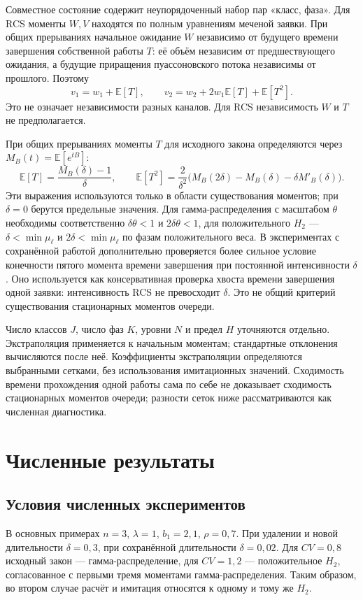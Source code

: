 \documentclass[a4paper,12pt]{article}
\begin{document}
Совместное состояние содержит неупорядоченный набор пар «класс, фаза». Для RCS моменты \(W,V\) находятся по полным уравнениям меченой заявки. При общих прерываниях начальное ожидание \(W\) независимо от будущего времени завершения собственной работы \(T\): её объём независим от предшествующего ожидания, а будущие приращения пуассоновского потока независимы от прошлого. Поэтому
\[
v_1=w_1+\mathbb E[T],\qquad
v_2=w_2+2w_1\mathbb E[T]+\mathbb E[T^2].
\]
Это не означает независимости разных каналов. Для RCS независимость \(W\) и \(T\) не предполагается.

При общих прерываниях моменты \(T\) для исходного закона определяются через \(M_B(t)=\mathbb E[e^{tB}]\):
\[
\mathbb E[T]=\frac{M_B(\delta)-1}{\delta},\qquad
\mathbb E[T^2]=\frac{2}{\delta^2}\bigl(M_B(2\delta)-M_B(\delta)-\delta M'_B(\delta)\bigr).
\]
Эти выражения используются только в области существования моментов; при \(\delta=0\) берутся предельные значения. Для гамма-распределения с масштабом \(\theta\) необходимы соответственно \(\delta\theta<1\) и \(2\delta\theta<1\), для положительного \(H_2\) --- \(\delta<\min\mu_\ell\) и \(2\delta<\min\mu_\ell\) по фазам положительного веса. В экспериментах с сохранённой работой дополнительно проверяется более сильное условие конечности пятого момента времени завершения при постоянной интенсивности \(\delta\). Оно используется как консервативная проверка хвоста времени завершения одной заявки: интенсивность RCS не превосходит \(\delta\). Это не общий критерий существования стационарных моментов очереди.

Число классов \(J\), число фаз \(K\), уровни \(N\) и предел \(H\) уточняются отдельно. Экстраполяция применяется к начальным моментам; стандартные отклонения вычисляются после неё. Коэффициенты экстраполяции определяются выбранными сетками, без использования имитационных значений. Сходимость времени прохождения одной работы сама по себе не доказывает сходимость стационарных моментов очереди; разности сеток ниже рассматриваются как численная диагностика.

\section{Численные результаты}\label{sec:results}
\subsection{Условия численных экспериментов}
В основных примерах \(n=3\), \(\lambda=1\), \(b_1=2{,}1\), \(\rho=0{,}7\). При удалении и новой длительности \(\delta=0{,}3\), при сохранённой длительности \(\delta=0{,}02\). Для \(CV=0{,}8\) исходный закон --- гамма-распределение, для \(CV=1{,}2\) --- положительное \(H_2\), согласованное с первыми тремя моментами гамма-распределения. Таким образом, во втором случае расчёт и имитация относятся к одному и тому же \(H_2\).
\end{document}

